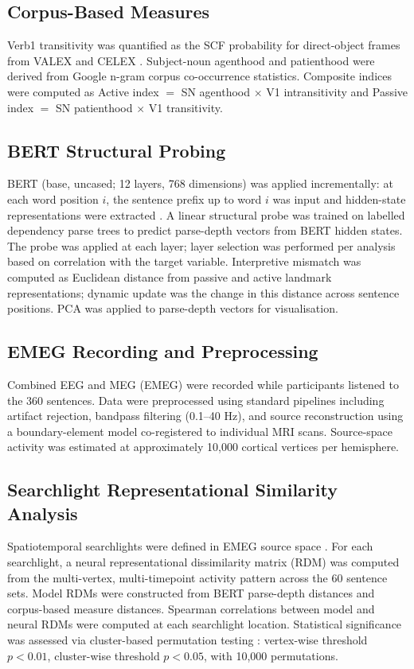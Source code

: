 \documentclass[11pt]{article}
\begin{document}
\subsection{Corpus-Based Measures}
Verb1 transitivity was quantified as the SCF probability for direct-object frames from VALEX \citep{korhonen2006large} and CELEX \citep{baayen1995celex}. Subject-noun agenthood and patienthood were derived from Google n-gram corpus co-occurrence statistics. Composite indices were computed as Active index $=$ SN agenthood $\times$ V1 intransitivity and Passive index $=$ SN patienthood $\times$ V1 transitivity.

\subsection{BERT Structural Probing}
BERT (base, uncased; 12 layers, 768 dimensions) was applied incrementally: at each word position $i$, the sentence prefix up to word $i$ was input and hidden-state representations were extracted \citep{devlin2019bert}. A linear structural probe was trained on labelled dependency parse trees \citep{demarneffe2006generating, hewitt2019structural} to predict parse-depth vectors from BERT hidden states. The probe was applied at each layer; layer selection was performed per analysis based on correlation with the target variable. Interpretive mismatch was computed as Euclidean distance from passive and active landmark representations; dynamic update was the change in this distance across sentence positions. PCA was applied to parse-depth vectors for visualisation.

\subsection{EMEG Recording and Preprocessing}
Combined EEG and MEG (EMEG) were recorded while participants listened to the 360 sentences. Data were preprocessed using standard pipelines including artifact rejection, bandpass filtering (0.1--40 Hz), and source reconstruction using a boundary-element model co-registered to individual MRI scans. Source-space activity was estimated at approximately 10,000 cortical vertices per hemisphere.

\subsection{Searchlight Representational Similarity Analysis}
Spatiotemporal searchlights were defined in EMEG source space \citep{su2022searchlight, kriegeskorte2008representational}. For each searchlight, a neural representational dissimilarity matrix (RDM) was computed from the multi-vertex, multi-timepoint activity pattern across the 60 sentence sets. Model RDMs were constructed from BERT parse-depth distances and corpus-based measure distances. Spearman correlations between model and neural RDMs were computed at each searchlight location. Statistical significance was assessed via cluster-based permutation testing \citep{maris2007nonparametric}: vertex-wise threshold $p < 0.01$, cluster-wise threshold $p < 0.05$, with 10,000 permutations.
\end{document}
